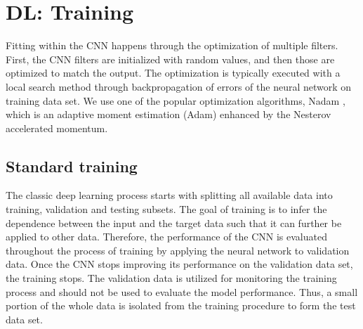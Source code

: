 \documentclass[paper,twocolomn]{geophysics}
\begin{document}


\section{DL: Training}
Fitting within the CNN happens through the optimization of multiple filters. First, the CNN filters are initialized with random values, and then those are optimized to match the output. The optimization is typically executed with a local search method through backpropagation of errors of the neural network on training data set. We use one of the popular optimization algorithms, Nadam \citep{dozat2016incorporating}, which is an adaptive moment estimation (Adam) enhanced by the Nesterov accelerated momentum.


%



\subsection{Standard training}

The classic deep learning process starts with splitting all available data into training, validation and testing subsets. 
The goal of training is
to infer the dependence between the input and the target data such that it can further be applied to other data. Therefore, the performance of the CNN is evaluated throughout the process of training by applying the neural network to validation data. Once the CNN stops improving its performance on the validation data set, the training stops. The validation data is utilized for monitoring the training process and should not be used to evaluate the model performance. Thus, a small portion of the whole data is isolated from the training procedure to form the test data set. 
\end{document}
